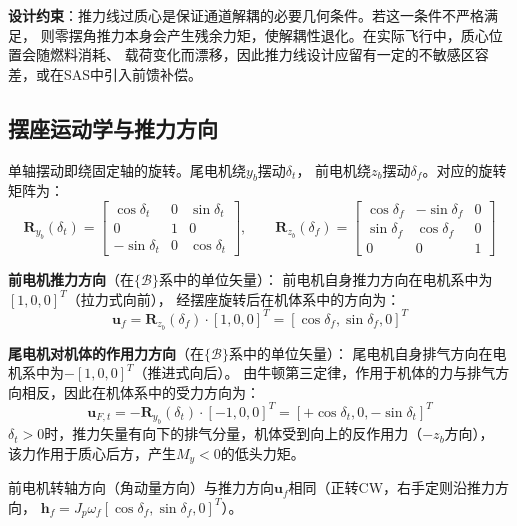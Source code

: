 \textbf{设计约束}：推力线过质心是保证通道解耦的必要几何条件。若这一条件不严格满足，
则零摆角推力本身会产生残余力矩，使解耦性退化。在实际飞行中，质心位置会随燃料消耗、
载荷变化而漂移，因此推力线设计应留有一定的不敏感区容差，或在SAS中引入前馈补偿。

\subsection{摆座运动学与推力方向}

单轴摆动即绕固定轴的旋转。尾电机绕$y_b$摆动$\delta_t$，
前电机绕$z_b$摆动$\delta_f$。对应的旋转矩阵为：
\begin{equation}
    \bm{R}_{y_b}(\delta_t) = \begin{bmatrix}
        \cos\delta_t & 0 & \sin\delta_t \\
        0 & 1 & 0 \\
        -\sin\delta_t & 0 & \cos\delta_t
    \end{bmatrix}, \qquad
    \bm{R}_{z_b}(\delta_f) = \begin{bmatrix}
        \cos\delta_f & -\sin\delta_f & 0 \\
        \sin\delta_f & \cos\delta_f & 0 \\
        0 & 0 & 1
    \end{bmatrix}
    \label{eq:gimbal_rotations}
\end{equation}

\textbf{前电机推力方向}（在$\{\mathcal{B}\}$系中的单位矢量）：
前电机自身推力方向在电机系中为$[1,0,0]^T$（拉力式向前），
经摆座旋转后在机体系中的方向为：
\begin{equation}
    \bm{u}_f = \bm{R}_{z_b}(\delta_f) \cdot [1, 0, 0]^T
    = [\cos\delta_f, \sin\delta_f, 0]^T
\end{equation}

\textbf{尾电机对机体的作用力方向}（在$\{\mathcal{B}\}$系中的单位矢量）：
尾电机自身排气方向在电机系中为$-[1,0,0]^T$（推进式向后）。
由牛顿第三定律，作用于机体的力与排气方向相反，因此在机体系中的受力方向为：
\begin{equation}
    \bm{u}_{F,t} = -\bm{R}_{y_b}(\delta_t) \cdot [-1, 0, 0]^T
    = [+\cos\delta_t, 0, -\sin\delta_t]^T
    \label{eq:tail_force_dir}
\end{equation}
$\delta_t > 0$时，推力矢量有向下的排气分量，机体受到向上的反作用力（$-z_b$方向），
该力作用于质心后方，产生$M_y<0$的低头力矩。

前电机转轴方向（角动量方向）与推力方向$\bm{u}_f$相同（正转CW，右手定则沿推力方向，
$\bm{h}_f = J_p \omega_f [\cos\delta_f, \sin\delta_f, 0]^T$）。

